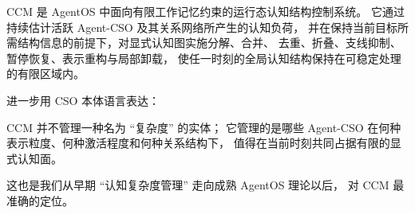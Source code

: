 \begin{definition*}
CCM 是 AgentOS 中面向有限工作记忆约束的运行态认知结构控制系统。
它通过持续估计活跃 Agent-CSO 及其关系网络所产生的认知负荷，
并在保持当前目标所需结构信息的前提下，对显式认知图实施分解、合并、
去重、折叠、支线抑制、暂停恢复、表示重构与局部卸载，
使任一时刻的全局认知结构保持在可稳定处理的有限区域内。
\end{definition*}

进一步用 CSO 本体语言表达：

\begin{statementbox}
CCM 并不管理一种名为 ``复杂度'' 的实体；
它管理的是哪些 Agent-CSO 在何种表示粒度、何种激活程度和何种关系结构下，
值得在当前时刻共同占据有限的显式认知面。
\end{statementbox}

这也是我们从早期 ``认知复杂度管理'' 走向成熟 AgentOS 理论以后，
对 CCM 最准确的定位。
